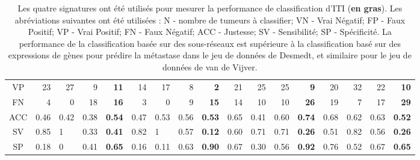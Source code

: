 \begin{sidewaystable}
\begin{center}
\begin{tabular}{crrrrrrrrrrrrrrrr}
						VP        & 23    & 27    & 9     & \textbf{11}                               & 14    & 17    & 8     & \textbf{2}                    & 21    & 25    & 25    & \textbf{9}                                & 20    & 32    & 22    & \textbf{10}                    \\
						FN        & 4     & 0     & 18    & \textbf{16}                               & 3     & 0     & 9     & \textbf{15}                   & 14    & 10    & 10    & \textbf{26}                               & 19    & 7     & 17    & \textbf{29}                    \\
						\midrule
						ACC       & 0.46  & 0.42  & 0.38  & \textbf{0.54}                             & 0.47  & 0.53  & 0.56  & \textbf{0.53}                 & 0.65  & 0.41  & 0.60  & \textbf{0.74}                             & 0.68  & 0.62  & 0.63  & \textbf{0.52}                  \\
						SV        & 0.85  & \multicolumn{1}{l}{1} & 0.33  & \textbf{0.41}             & 0.82  & \multicolumn{1}{l}{1} & 0.57  & \textbf{0.12} & 0.60  & 0.71  & 0.71  & \textbf{0.26}                             & 0.51  & 0.82  & 0.56  & \textbf{0.26}                  \\
						SP        & 0.18  & \multicolumn{1}{l}{0} & 0.41  & \textbf{0.65}             & 0.16  & 0.11                  & 0.63  & \textbf{0.90} & 0.67  & 0.30  & 0.56  & \textbf{0.92}                             & 0.76  & 0.52  & 0.67  & \textbf{0.65}                  \\
						\bottomrule
					\end{tabular}
					\label{tab:Res2Classif}
					\vspace{5ex}
					\caption*{Les quatre signatures ont été utilisés pour mesurer la performance de classification d'ITI (\textbf{en gras}). Les abréviations suivantes ont été utilisées : N - nombre de tumeurs à classifier; VN - Vrai Négatif; FP - Faux Positif; VP - Vrai Positif; FN - Faux Négatif; ACC - Justesse; SV - Sensibilité; SP - Spécificité. La performance de la classification basée sur des sous-réseaux est supérieure à la classification basé sur des expressions de gènes pour prédire la métastase dans le jeu de données de Desmedt, et similaire pour le jeu de données de van de Vijver.}
				\end{center}
			\end{sidewaystable}

